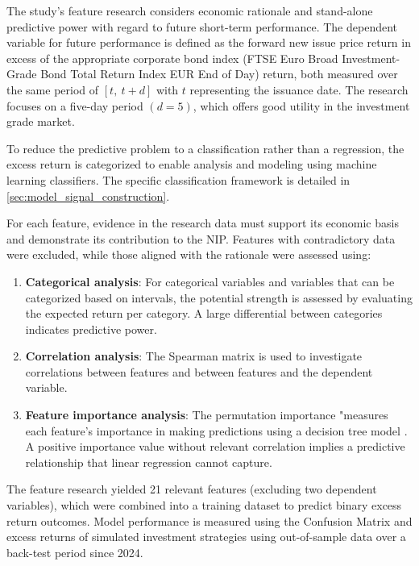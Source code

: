 The study's feature research considers economic rationale and stand-alone predictive power with regard to future short-term performance. The dependent variable for future performance is defined as the forward new issue price return in excess of the appropriate corporate bond index (FTSE Euro Broad Investment-Grade Bond Total Return Index EUR End of Day) return, both measured over the same period of $[t,\ t + d]$ with $t$ representing the issuance date. The research focuses on a five-day period $(d=5)$, which offers good utility in the investment grade market.

To reduce the predictive problem to a classification rather than a regression, the excess return is categorized to enable analysis and modeling using machine learning classifiers. The specific classification framework is detailed in \ref{sec:model_signal_construction}.

For each feature, evidence in the research data must support its economic basis and demonstrate its contribution to the NIP. Features with contradictory data were excluded, while those aligned with the rationale were assessed using:

\begin{enumerate}
    \item \textbf{Categorical analysis}: For categorical variables and variables that can be categorized based on intervals, the potential strength is assessed by evaluating the expected return per category. A large differential between categories indicates predictive power.
    \item \textbf{Correlation analysis}: The Spearman matrix is used to investigate correlations between features and between features and the dependent variable.
    \item \textbf{Feature importance analysis}: The permutation importance "measures each feature’s importance in making predictions using a decision tree model \parencite[p. 140]{Harrison2023EffectiveModels}. A positive importance value without relevant correlation implies a predictive relationship that linear regression cannot capture.
\end{enumerate}

The feature research yielded 21 relevant features (excluding two dependent variables), which were combined into a training dataset to predict binary excess return outcomes. Model performance is measured using the Confusion Matrix and excess returns of simulated investment strategies using out-of-sample data over a back-test period since 2024.

